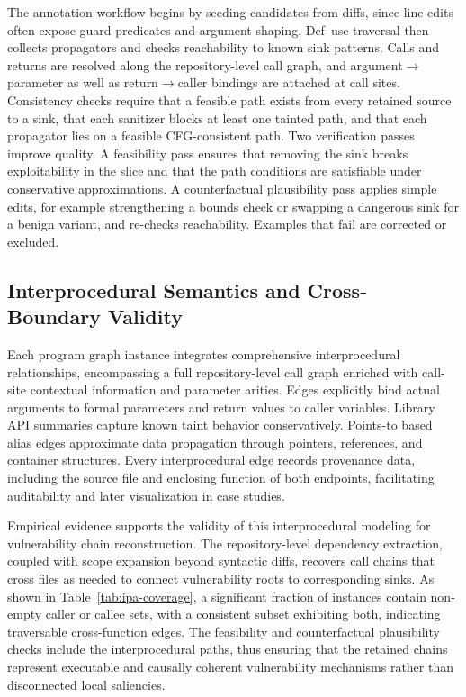 \documentclass{buthesis}
\begin{document}
The annotation workflow begins by seeding candidates from diffs, since line edits often expose guard predicates and argument shaping. Def–use traversal then collects propagators and checks reachability to known sink patterns. Calls and returns are resolved along the repository-level call graph, and argument$\rightarrow$parameter as well as return$\rightarrow$caller bindings are attached at call sites. Consistency checks require that a feasible path exists from every retained source to a sink, that each sanitizer blocks at least one tainted path, and that each propagator lies on a feasible CFG-consistent path. Two verification passes improve quality. A feasibility pass ensures that removing the sink breaks exploitability in the slice and that the path conditions are satisfiable under conservative approximations. A counterfactual plausibility pass applies simple edits, for example strengthening a bounds check or swapping a dangerous sink for a benign variant, and re-checks reachability. Examples that fail are corrected or excluded.

\subsection{Interprocedural Semantics and Cross-Boundary Validity}
\label{subsec:interproc-semantics}

Each program graph instance integrates comprehensive interprocedural relationships, encompassing a full repository-level call graph enriched with call-site contextual information and parameter arities. Edges explicitly bind actual arguments to formal parameters and return values to caller variables. Library API summaries capture known taint behavior conservatively. Points-to based alias edges approximate data propagation through pointers, references, and container structures. Every interprocedural edge records provenance data, including the source file and enclosing function of both endpoints, facilitating auditability and later visualization in case studies.

Empirical evidence supports the validity of this interprocedural modeling for vulnerability chain reconstruction. The repository-level dependency extraction, coupled with scope expansion beyond syntactic diffs, recovers call chains that cross files as needed to connect vulnerability roots to corresponding sinks. As shown in Table~\ref{tab:ipa-coverage}, a significant fraction of instances contain non-empty caller or callee sets, with a consistent subset exhibiting both, indicating traversable cross-function edges. The feasibility and counterfactual plausibility checks include the interprocedural paths, thus ensuring that the retained chains represent executable and causally coherent vulnerability mechanisms rather than disconnected local saliencies.
\end{document}
